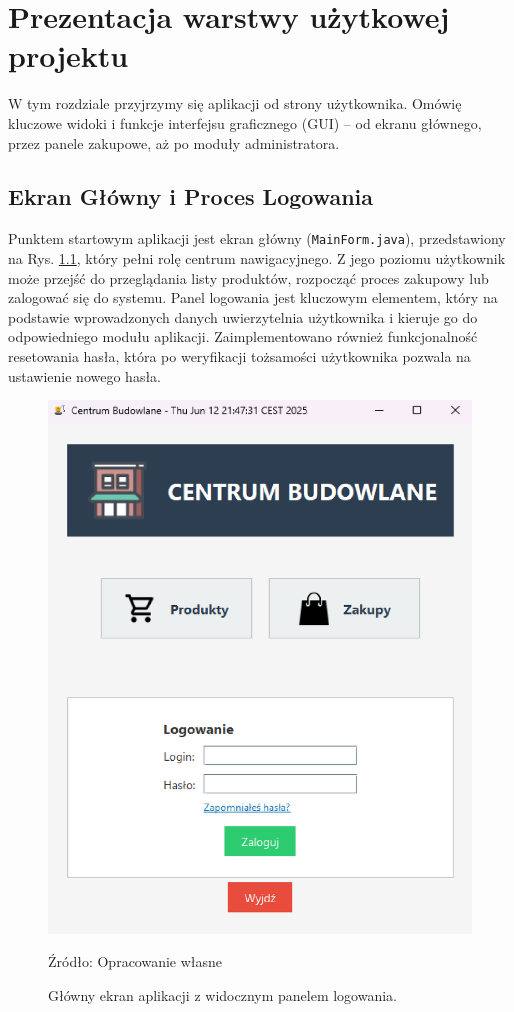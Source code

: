 
\chapter{Prezentacja warstwy użytkowej projektu}
\label{chap:warstwa_uzytkowa}
W tym rozdziale przyjrzymy się aplikacji od strony użytkownika. Omówię kluczowe widoki i funkcje interfejsu graficznego (GUI) – od ekranu głównego, przez panele zakupowe, aż po moduły administratora.

\section{Ekran Główny i Proces Logowania}
Punktem startowym aplikacji jest ekran główny (\texttt{MainForm.java}), przedstawiony na Rys. \ref{fig:main_form}, który pełni rolę centrum nawigacyjnego. Z jego poziomu użytkownik może przejść do przeglądania listy produktów, rozpocząć proces zakupowy lub zalogować się do systemu. Panel logowania jest kluczowym elementem, który na podstawie wprowadzonych danych uwierzytelnia użytkownika i kieruje go do odpowiedniego modułu aplikacji. Zaimplementowano również funkcjonalność resetowania hasła, która po weryfikacji tożsamości użytkownika pozwala na ustawienie nowego hasła.

\begin{figure}[H]
    \centering
    \includegraphics[width=0.6\linewidth]{figures/fig_0010.eps} 
    \caption{Główny ekran aplikacji z widocznym panelem logowania.}
    \label{fig:main_form}
    \small{Źródło: Opracowanie własne}
\end{figure}
\clearpage

